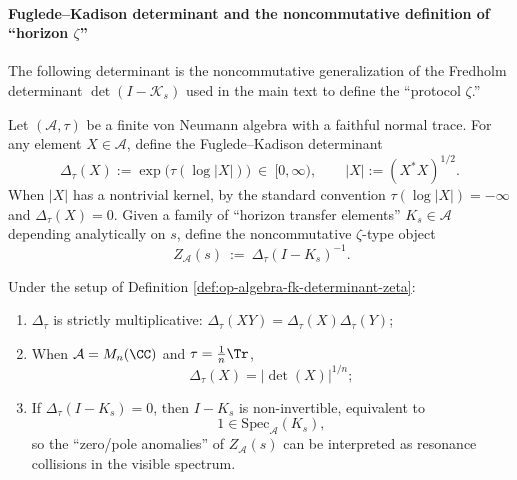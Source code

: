 \paragraph{Fuglede--Kadison determinant and the noncommutative definition of ``horizon \texorpdfstring{$\zeta$}{zeta}''}
The following determinant is the noncommutative generalization of the Fredholm determinant \(\det(I-\mathcal{K}_s)\) used in the main text to define the ``protocol \(\zeta\).''

\begin{definition}\label{def:op-algebra-fk-determinant-zeta}
Let \((\mathcal{A},\tau)\) be a finite von Neumann algebra with a faithful normal trace.
For any element \(X\in\mathcal{A}\), define the Fuglede--Kadison determinant
\begin{equation}\label{eq:op-algebra-fkdet}
\boxed{\;\Delta_\tau(X):=\exp\bigl(\tau(\log|X|)\bigr)\ \in\ [0,\infty),\qquad |X|:=(X^\ast X)^{1/2}.\;}
\end{equation}
When \(|X|\) has a nontrivial kernel, by the standard convention \(\tau(\log|X|)=-\infty\) and \(\Delta_\tau(X)=0\).
Given a family of ``horizon transfer elements'' \(K_s\in\mathcal{A}\) depending analytically on \(s\), define the noncommutative \(\zeta\)-type object
\begin{equation}\label{eq:op-algebra-nc-zeta}
\boxed{\;
Z_{\mathcal{A}}(s)\ :=\ \Delta_\tau(I-K_s)^{-1}.
}
\end{equation}
\end{definition}

\begin{proposition}\label{prop:op-algebra-fkdet-properties}
Under the setup of Definition \ref{def:op-algebra-fk-determinant-zeta}:
\begin{enumerate}
  \item \(\Delta_\tau\) is strictly multiplicative: \(\Delta_\tau(XY)=\Delta_\tau(X)\Delta_\tau(Y)\);
  \item When \(\mathcal{A}=M_n(\CC)\) and \(\tau=\frac{1}{n}\Tr\),
  \[
  \Delta_\tau(X)=|\det(X)|^{1/n};
  \]
  \item If \(\Delta_\tau(I-K_s)=0\), then \(I-K_s\) is non-invertible, equivalent to
  \begin{equation}\label{eq:op-algebra-resonance}
  \boxed{\;1\in\mathrm{Spec}_{\mathcal{A}}(K_s),\;}
  \end{equation}
  so the ``zero/pole anomalies'' of \(Z_{\mathcal{A}}(s)\) can be interpreted as resonance collisions in the visible spectrum.
\end{enumerate}
\end{proposition}

